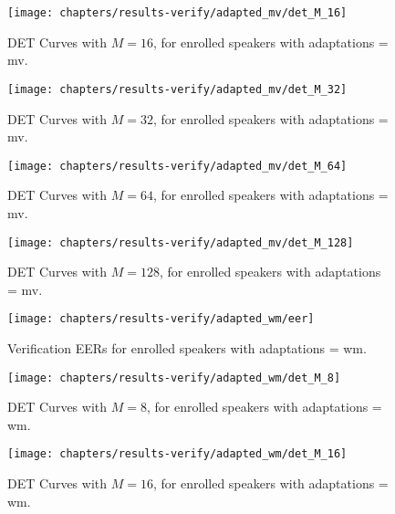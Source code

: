 \begin{figure}[ht]
	\centering
	\texttt{[image: chapters/results-verify/adapted\_mv/det\_M\_16]}
	\caption{DET Curves with $M = 16$, for enrolled speakers with adaptations = mv.}
	\label{fig:results-verify-adapted_mv-M_16}
\end{figure}

\newpage
\begin{figure}[ht]
	\centering
	\texttt{[image: chapters/results-verify/adapted\_mv/det\_M\_32]}
	\caption{DET Curves with $M = 32$, for enrolled speakers with adaptations = mv.}
	\label{fig:results-verify-adapted_mv-M_32}
\end{figure}

\begin{figure}[ht]
	\centering
	\texttt{[image: chapters/results-verify/adapted\_mv/det\_M\_64]}
	\caption{DET Curves with $M = 64$, for enrolled speakers with adaptations = mv.}
	\label{fig:results-verify-adapted_mv-M_64}
\end{figure}

\newpage
\begin{figure}[ht]
	\centering
	\texttt{[image: chapters/results-verify/adapted\_mv/det\_M\_128]}
	\caption{DET Curves with $M = 128$, for enrolled speakers with adaptations = mv.}
	\label{fig:results-verify-adapted_mv-M_128}
\end{figure}

\clearpage

\newpage


\begin{figure}[ht]
	\centering
	\texttt{[image: chapters/results-verify/adapted\_wm/eer]}
	\caption{Verification EERs for enrolled speakers with adaptations = wm.}
	\label{fig:results-verify-adapted_wm}
\end{figure}

\newpage
\begin{figure}[ht]
	\centering
	\texttt{[image: chapters/results-verify/adapted\_wm/det\_M\_8]}
	\caption{DET Curves with $M = 8$, for enrolled speakers with adaptations = wm.}
	\label{fig:results-verify-adapted_wm-M_8}
\end{figure}

\begin{figure}[ht]
	\centering
	\texttt{[image: chapters/results-verify/adapted\_wm/det\_M\_16]}
	\caption{DET Curves with $M = 16$, for enrolled speakers with adaptations = wm.}
	\label{fig:results-verify-adapted_wm-M_16}
\end{figure}

